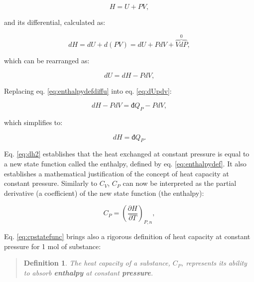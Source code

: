 \documentclass[
  9pt,
]{extbook}
\theoremstyle{definition}
\newtheorem{definition}{Definition}[chapter]
\theoremstyle{definition}
\theoremstyle{definition}
\theoremstyle{remark}
\begin{document}
\begin{equation}
  H = U + PV,
  \label{eq:enthalpydef}
\end{equation}

and its differential, calculated as:

\begin{equation}
  dH = dU + d(PV) = dU + PdV + \overbrace{VdP}^{0},
  \label{eq:enthalpydefdiff}
\end{equation}

which can be rearranged as:

\begin{equation}
  dU = dH -PdV,
  \label{eq:enthalpydefdiffu}
\end{equation}

Replacing eq. \eqref{eq:enthalpydefdiffu} into eq. \eqref{eq:dUpdv}:

\begin{equation}
  dH -PdV = đ Q_P - PdV,
  \label{eq:dh1}
\end{equation}

which simplifies to:

\begin{equation}
  dH = đ Q_P.
  \label{eq:dh2}
\end{equation}

Eq. \eqref{eq:dh2} establishes that the heat exchanged at constant pressure is equal to a new state function called the enthalpy, defined by eq. \eqref{eq:enthalpydef}. It also establishes a mathematical justification of the concept of heat capacity at constant pressure. Similarly to \(C_V\), \(C_P\) can now be interpreted as the partial derivative (a coefficient) of the new state function (the enthalpy):

\begin{equation}
  C_P = \left( \frac{\partial H} {\partial T} \right)_{P,n},
  \label{eq:cpstatefunc}
\end{equation}

Eq. \eqref{eq:cpstatefunc} brings also a rigorous definition of heat capacity at constant pressure for 1 mol of substance:

\begin{quote}
\begin{definition}
\protect\hypertarget{def:newdefcp}{}{\label{def:newdefcp} }\emph{The heat capacity of a substance, \(C_P\), represents its ability to absorb \textbf{enthalpy} at constant \textbf{pressure}.}
\end{definition}
\end{quote}
\end{document}
